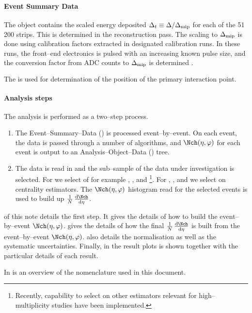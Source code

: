 \paragraph{Event Summary Data} 
The \FMD{} \ESD{} object contains the scaled energy deposited
$\Delta_t\equiv\Delta /\Delta_{\text{mip}}$ for each of the 51\,200 strips.  This
is determined in the reconstruction pass.  The scaling to $\Delta_{\text{mip}}$
is done using calibration factors extracted in designated calibration
runs.  In these runs, the front--end electronics is pulsed with an
increasing known pulse size, and the conversion factor from ADC counts
to $\Delta_{\text{mip}}$ is determined \cite{cholm:2009}.

The \SPD{} is used for determination of the position of the primary
interaction point.

\paragraph{Analysis steps} 
The analysis is performed as a two--step process.  
\begin{enumerate}
\item The Event--Summary--Data (\ESD{}) is processed event--by--event.
  On each event, the data is passed through a number of algorithms,
  and $\dndetadphi$ for each event is output to an
  Analysis--Object--Data (\AOD{}) tree.
\item The \AOD{} data is read in and the sub--sample of the data under
  investigation is selected. For \ppCol{} we select of for example
  \INEL{}, \INELONE{}, and \NSD{}\footnote{Recently, capability to
    select on other estimators relevant for high--multiplicity studies
    have been implemented.}. For \PbPbCol{}, \pPbCol{}, and \PbpCol{}
  we select on centrality estimators.  The $\dndetadphi$ histogram
  read for the selected events is used to build up $\ndndeta$.
\end{enumerate}

 of this note details the first step.  It gives
the details of how to build the event--by--event $\dndetadphi$.
 gives the details of how the final $\ndndeta$ is
built from the event--by--event $\dndetadphi$.  
also details the normalisation as well as the systematic
uncertainties.  Finally, in  the result plots is
shown together with the particular details of each result. 

In  is an overview of the nomenclature used in
this document.
